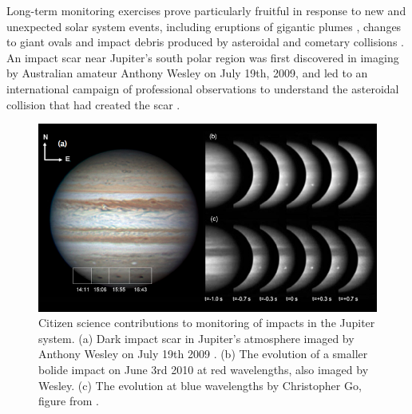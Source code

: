 \documentclass{ar2e}
\begin{document}
Long-term monitoring exercises prove particularly fruitful in response to new
and unexpected solar system events, including eruptions of gigantic plumes
\citep{08sanchez, 11fletcher}, changes to giant ovals \citep{06simon-miller} and
impact debris produced by asteroidal and cometary collisions \citep{10hammel}. 
An impact scar near Jupiter's south polar region was first discovered in imaging
by Australian amateur Anthony Wesley on July 19th, 2009, and led to an
international campaign of professional observations to understand the asteroidal
collision that had created the scar \citep[e.g.,][]{10depater,11orton}.  

\begin{figure}[!ht]
\centering\includegraphics[width=\linewidth]{figs/jupiter-impacts.png}
\caption{Citizen science contributions to monitoring of impacts in the Jupiter
system. (a) Dark impact scar in Jupiter's atmosphere imaged by Anthony
Wesley on July 19th 2009 \citep{Sanchez-LavegaEtal2010}. (b) The
evolution of a smaller bolide impact on June 3rd 2010 at red
wavelengths, also imaged by Wesley. (c) The evolution at blue
wavelengths by Christopher Go, figure from \citet{HuesoEtal2010}.}
\label{fig:jupiter-impacts}
\end{figure}
\end{document}

